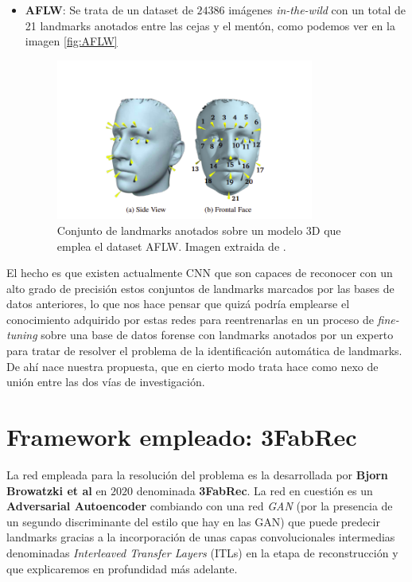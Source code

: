 \begin{itemize}
    \item \textbf{AFLW}: Se trata de un dataset de $24386$ imágenes \textit{in-the-wild} con un total de 21 landmarks anotados entre las cejas y el mentón, como podemos ver en la imagen \autoref{fig:AFLW}  \cite{AFLW}
    \begin{figure}[!h]
        \centering
        \includegraphics[width=0.8\textwidth]{img/AFLW.png}
        \caption{Conjunto de landmarks anotados sobre un modelo $3$D que emplea el dataset AFLW. Imagen extraida de \cite{AFLW}.}
        \label{fig:AFLW}
    \end{figure}
    \end{itemize}

    \medskip

    \noindent El hecho es que existen actualmente CNN que son capaces de reconocer con un alto grado de precisión estos conjuntos de landmarks marcados por las bases de datos anteriores, lo que nos hace pensar que quizá podría emplearse el conocimiento adquirido por estas redes para reentrenarlas en un proceso de \textit{fine-tuning} sobre una base de datos forense con landmarks anotados por un experto para tratar de resolver el problema de la identificación automática de landmarks. De ahí nace nuestra propuesta, que en cierto modo trata hace como nexo de unión entre las dos vías de investigación. 


\section{Framework empleado: 3FabRec }
        \noindent La red empleada para la resolución del problema es la desarrollada por \textbf{Bjorn Browatzki et al} en $2020$ \cite{browatzki20203fabrec} denominada \textbf{3FabRec}. La red en cuestión es un \textbf{Adversarial Autoencoder} combiando con una red \textit{GAN} (por la presencia de un segundo discriminante del estilo que hay en las GAN) que puede predecir landmarks gracias a la incorporación de unas capas convolucionales intermedias denominadas \textit{Interleaved Transfer Layers} (ITLs) en la etapa de reconstrucción y que explicaremos en profundidad más adelante.            

